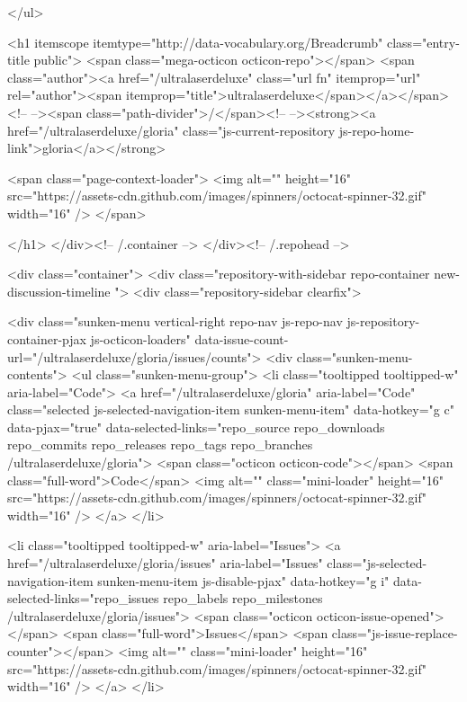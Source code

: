 </ul>

        <h1 itemscope itemtype="http://data-vocabulary.org/Breadcrumb" class="entry-title public">
          <span class="mega-octicon octicon-repo"></span>
          <span class="author"><a href="/ultralaserdeluxe" class="url fn" itemprop="url" rel="author"><span itemprop="title">ultralaserdeluxe</span></a></span><!--
       --><span class="path-divider">/</span><!--
       --><strong><a href="/ultralaserdeluxe/gloria" class="js-current-repository js-repo-home-link">gloria</a></strong>

          <span class="page-context-loader">
            <img alt="" height="16" src="https://assets-cdn.github.com/images/spinners/octocat-spinner-32.gif" width="16" />
          </span>

        </h1>
      </div><!-- /.container -->
    </div><!-- /.repohead -->

    <div class="container">
      <div class="repository-with-sidebar repo-container new-discussion-timeline  ">
        <div class="repository-sidebar clearfix">
            
<div class="sunken-menu vertical-right repo-nav js-repo-nav js-repository-container-pjax js-octicon-loaders" data-issue-count-url="/ultralaserdeluxe/gloria/issues/counts">
  <div class="sunken-menu-contents">
    <ul class="sunken-menu-group">
      <li class="tooltipped tooltipped-w" aria-label="Code">
        <a href="/ultralaserdeluxe/gloria" aria-label="Code" class="selected js-selected-navigation-item sunken-menu-item" data-hotkey="g c" data-pjax="true" data-selected-links="repo_source repo_downloads repo_commits repo_releases repo_tags repo_branches /ultralaserdeluxe/gloria">
          <span class="octicon octicon-code"></span> <span class="full-word">Code</span>
          <img alt="" class="mini-loader" height="16" src="https://assets-cdn.github.com/images/spinners/octocat-spinner-32.gif" width="16" />
</a>      </li>

        <li class="tooltipped tooltipped-w" aria-label="Issues">
          <a href="/ultralaserdeluxe/gloria/issues" aria-label="Issues" class="js-selected-navigation-item sunken-menu-item js-disable-pjax" data-hotkey="g i" data-selected-links="repo_issues repo_labels repo_milestones /ultralaserdeluxe/gloria/issues">
            <span class="octicon octicon-issue-opened"></span> <span class="full-word">Issues</span>
            <span class="js-issue-replace-counter"></span>
            <img alt="" class="mini-loader" height="16" src="https://assets-cdn.github.com/images/spinners/octocat-spinner-32.gif" width="16" />
</a>        </li>

